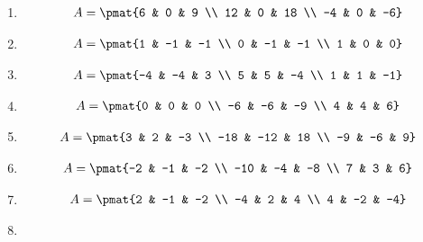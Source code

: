 \begin{enumerate}
\item

\begin{align*}
A = \pmat{6 & 0 & 9 \\ 12 & 0 & 18 \\ -4 & 0 & -6}
\end{align*}

\item

\begin{align*}
A = \pmat{1 & -1 & -1 \\ 0 & -1 & -1 \\ 1 & 0 & 0}
\end{align*}

\item

\begin{align*}
A = \pmat{-4 & -4 & 3 \\ 5 & 5 & -4 \\ 1 & 1 & -1}
\end{align*}

\item

\begin{align*}
A = \pmat{0 & 0 & 0 \\ -6 & -6 & -9 \\ 4 & 4 & 6}
\end{align*}

\item

\begin{align*}
A = \pmat{3 & 2 & -3 \\ -18 & -12 & 18 \\ -9 & -6 & 9}
\end{align*}

\item

\begin{align*}
A = \pmat{-2 & -1 & -2 \\ -10 & -4 & -8 \\ 7 & 3 & 6}
\end{align*}

\item

\begin{align*}
A = \pmat{2 & -1 & -2 \\ -4 & 2 & 4 \\ 4 & -2 & -4}
\end{align*}

\item


\end{enumerate}
